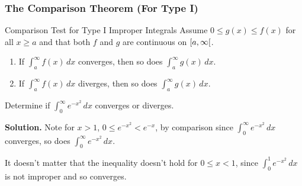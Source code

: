 \subsubsection{The Comparison Theorem (For Type I)}
\begin{Theorem}{Comparison Test for Type I Improper Integrals}{}
    Assume $ 0\leqslant g(x)\leqslant f(x) $ for all $ x\geqslant a $
    and that both $ f $ and $ g $ are continuous on $ \interval[open right]{a}{\infty} $.
    \begin{enumerate}[label=(\arabic*)]
        \item If $ \displaystyle \int_a^{\infty}f(x)\, d{x} $ converges, then so does
              $ \displaystyle \int_a^{\infty}g(x)\, d{x} $.
        \item If $ \displaystyle \int_a^{\infty}f(x)\, d{x} $ diverges, then so does
              $ \displaystyle \int_a^{\infty}g(x)\, d{x} $.
    \end{enumerate}
\end{Theorem}
\begin{Example}{}{}
    Determine if $ \displaystyle \int_0^\infty e^{-x^2}\, d{x} $ converges or diverges.

    \textbf{Solution.} Note for $ x>1 $,
    $ 0\leqslant e^{-x^2} <e^{-x} $, by comparison since
    $ \displaystyle \int_{0}^{\infty} e^{-x^2}\, d{x} $ converges, so does
    $ \displaystyle \int_{0}^{\infty} e^{-x^2}\, d{x} $.
\end{Example}
\begin{Remark}{}{}
    It doesn't matter that the inequality doesn't hold for $ 0\leqslant x<1 $,
    since $ \int_{0}^{1}e^{-x^2} \, d{x} $ is not improper and so converges.
\end{Remark}

